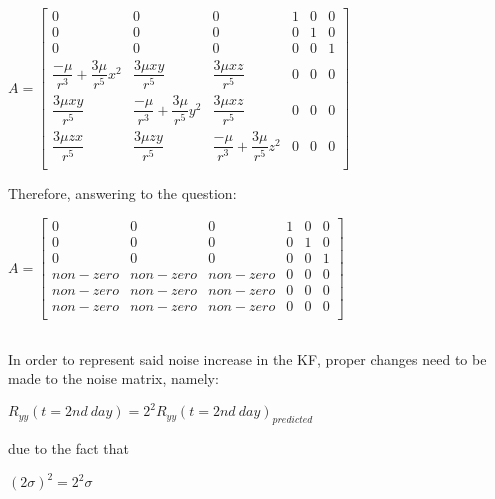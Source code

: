 \subsection{}
\begin{center}
	$A =  \begin{bmatrix}
	         0 & 0 & 0 & 1 & 0 & 0 \\[6pt]
	         0 & 0 & 0 & 0 & 1 & 0 \\[6pt]
	         0 & 0 & 0 & 0 & 0 & 1 \\[6pt]
	         \dfrac{-\mu}{r^3}+\dfrac{3\mu}{r^5}x^2 & \dfrac{3\mu xy}{r^5} & \dfrac{3\mu xz}{r^5} & 0 & 0 & 0 \\[6pt]
	         \dfrac{3\mu xy}{r^5} & \dfrac{-\mu}{r^3}+\dfrac{3\mu}{r^5}y^2 & \dfrac{3\mu xz}{r^5} & 0 & 0 & 0 \\[6pt]
	         \dfrac{3\mu zx}{r^5} & \dfrac{3\mu zy}{r^5} & \dfrac{-\mu}{r^3}+\dfrac{3\mu}{r^5}z^2 & 0 & 0 & 0 \\[6pt]
	    
	    \end{bmatrix}$
\end{center}
Therefore, answering to the question:
\begin{center}
	$A =  \begin{bmatrix}
	         0 & 0 & 0 & 1 & 0 & 0 \\[6pt]
	         0 & 0 & 0 & 0 & 1 & 0 \\[6pt]
	         0 & 0 & 0 & 0 & 0 & 1 \\[6pt]
	         non-zero & non-zero & non-zero & 0 & 0 & 0 \\[6pt]
	        non-zero & non-zero & non-zero & 0 & 0 & 0 \\[6pt]
	        non-zero & non-zero & non-zero & 0 & 0 & 0 \\[6pt]
	    
	    \end{bmatrix}$
\end{center}

\subsection{}
In order to represent said noise increase in the KF, proper changes need to be made to the noise matrix, namely:
\begin{center}
	$R_{yy} (t=2nd \: day) = 2^2 R_{yy} (t =2nd \: day)_{predicted} $
\end{center}
due to the fact that
\begin{center}
	$(2\sigma)^2 = 2^2 \sigma$
\end{center}

